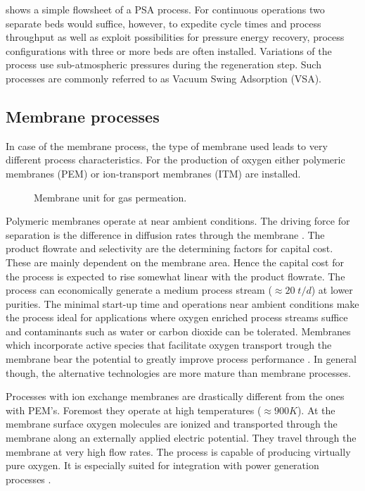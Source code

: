          shows a simple flowsheet of a PSA process. For continuous operations two separate beds would
        suffice, however, to expedite cycle times and process throughput as well as exploit possibilities for pressure
        energy recovery, process configurations with three or more beds are often installed. Variations of the process
        use sub-atmospheric pressures during the regeneration step. Such processes are commonly referred to as Vacuum Swing
        Adsorption (VSA).
    
        \subsection{Membrane processes}
        \label{sec:membrane}
        In case of the membrane process, the type of membrane used leads to very different process characteristics. For the
        production of oxygen either polymeric membranes (PEM) or ion-transport membranes (ITM) are installed.
    
         \begin{figure}
        	\center
        	
    	    \caption{Membrane unit for gas permeation.}
        	\label{fig:gas_permeation}
        \end{figure}
    
        Polymeric membranes operate at near ambient conditions. The driving force for separation is the difference
        in diffusion rates through the membrane \cite{Melin.2007}. The product flowrate and selectivity are the
        determining factors for capital cost. These are mainly dependent on the membrane area. Hence
        the capital cost for the process is expected to rise somewhat linear with the product flowrate.
        The process can economically generate a medium process stream ($\approx 20 \; t/d$) at lower purities.
        The minimal start-up time and operations near ambient conditions make the process ideal for
        applications where oxygen enriched process streams suffice and contaminants such as water or carbon
        dioxide can be tolerated. Membranes which incorporate active species that facilitate oxygen transport
        trough the membrane bear the potential to greatly improve process performance \cite{Kammermeyer.1976}.
        In general though, the alternative technologies are more mature than membrane processes.
    
        Processes with ion exchange membranes are drastically different from the ones with PEM's. Foremost they
        operate at high temperatures ($\approx 900 K$). At the membrane surface oxygen molecules are ionized
        and transported through the membrane along an externally applied electric potential. They travel
        through the membrane at very high flow rates. The process is capable of producing virtually pure
        oxygen. It is especially suited for integration with power generation processes \cite{Smith.2001}.
    
